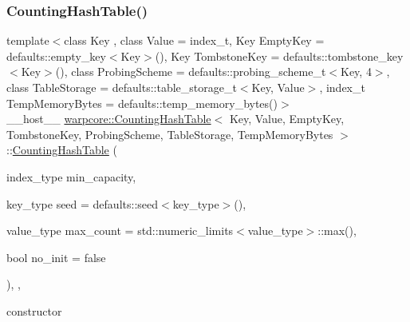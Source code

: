 \subsubsection{\texorpdfstring{Counting\+Hash\+Table()}{CountingHashTable()}\hspace{0.1cm}{\footnotesize\ttfamily [1/3]}}
{\footnotesize\ttfamily template$<$class Key , class Value  = index\+\_\+t, Key Empty\+Key = defaults\+::empty\+\_\+key$<$\+Key$>$(), Key Tombstone\+Key = defaults\+::tombstone\+\_\+key$<$\+Key$>$(), class Probing\+Scheme  = defaults\+::probing\+\_\+scheme\+\_\+t$<$\+Key, 4$>$, class Table\+Storage  = defaults\+::table\+\_\+storage\+\_\+t$<$\+Key, Value$>$, index\+\_\+t Temp\+Memory\+Bytes = defaults\+::temp\+\_\+memory\+\_\+bytes()$>$ \\
\+\_\+\+\_\+host\+\_\+\+\_\+ \hyperlink{classwarpcore_1_1CountingHashTable}{warpcore\+::\+Counting\+Hash\+Table}$<$ Key, Value, Empty\+Key, Tombstone\+Key, Probing\+Scheme, Table\+Storage, Temp\+Memory\+Bytes $>$\+::\hyperlink{classwarpcore_1_1CountingHashTable}{Counting\+Hash\+Table} (\begin{DoxyParamCaption}\item[{index\+\_\+type}]{min\+\_\+capacity,  }\item[{key\+\_\+type}]{seed = {\ttfamily defaults\+:\+:seed$<$key\+\_\+type$>$()},  }\item[{value\+\_\+type}]{max\+\_\+count = {\ttfamily std\+:\+:numeric\+\_\+limits$<$value\+\_\+type$>$\+:\+:max()},  }\item[{bool}]{no\+\_\+init = {\ttfamily false} }\end{DoxyParamCaption})\hspace{0.3cm}{\ttfamily [inline]}, {\ttfamily [explicit]}, {\ttfamily [noexcept]}}



constructor 


